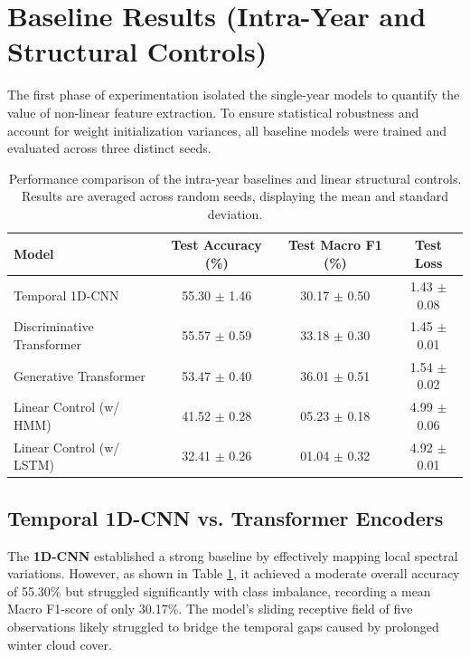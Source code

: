 \section{Baseline Results (Intra-Year and Structural Controls)}
\label{sec:baseline_results}

The first phase of experimentation isolated the single-year models to quantify the value of non-linear feature extraction.
To ensure statistical robustness and account for weight initialization variances, all baseline models were trained and evaluated across three distinct seeds.

\begin{table}[htpb]
    \centering
    \renewcommand{\arraystretch}{1.2}
    \begin{tabular}{lccc}
        \toprule
        \textbf{Model} & \textbf{Test Accuracy (\%)} & \textbf{Test Macro F1 (\%)} & \textbf{Test Loss} \\
        \midrule
        Temporal 1D-CNN & 55.30 $\pm$ 1.46 & 30.17 $\pm$ 0.50 & 1.43 $\pm$ 0.08 \\
        Discriminative Transformer & 55.57 $\pm$ 0.59 & 33.18 $\pm$ 0.30 & 1.45 $\pm$ 0.01 \\
        Generative Transformer & 53.47 $\pm$ 0.40 & 36.01 $\pm$ 0.51 & 1.54 $\pm$ 0.02 \\
        \midrule
        Linear Control (w/ HMM) & 41.52 $\pm$ 0.28 & 05.23 $\pm$ 0.18 & 4.99 $\pm$ 0.06 \\
        Linear Control (w/ LSTM) & 32.41 $\pm$ 0.26 & 01.04 $\pm$ 0.32 & 4.92 $\pm$ 0.01 \\
        \bottomrule
    \end{tabular}
    \caption{Performance comparison of the intra-year baselines and linear structural controls.
        Results are averaged across random seeds, displaying the mean and standard deviation.}
    \label{tab:baseline_comparison}
\end{table}

\subsection{Temporal 1D-CNN vs. Transformer Encoders}

The \textbf{1D-CNN} established a strong baseline by effectively mapping local spectral variations.
However, as shown in Table \ref{tab:baseline_comparison}, it achieved a moderate overall accuracy of 55.30\% but
struggled significantly with class imbalance, recording a mean Macro F1-score of only 30.17\%.
The model's sliding receptive field of five observations likely struggled to bridge the temporal gaps caused by prolonged winter cloud cover.


